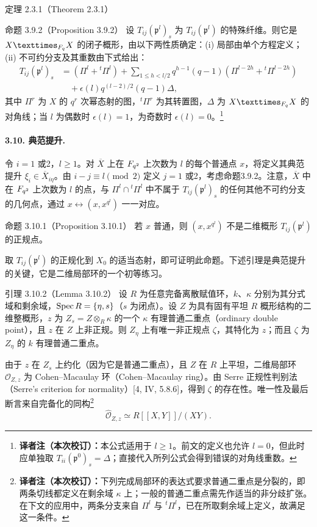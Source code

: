 \begin{originaltheorem}{定理 2.3.1（Theorem 2.3.1）}
\begin{originaltheorem}{命题 3.9.2（Proposition 3.9.2）}
设 $T_{ij}(\mathfrak p^l)_s$ 为 $T_{ij}(\mathfrak p^l)$ 的特殊纤维。则它是 $X\times_{\F_q}X$ 的闭子概形，由以下两性质确定：(i) 局部由单个方程定义；(ii) 不可约分支及其重数由下式给出：
\begin{align*}
 T_{ij}(\mathfrak p^l)_s
 &=(\Pi^l+{}^t\Pi^l)
 +\sum_{1\leq h<l/2}q^{h-1}(q-1)(\Pi^{l-2h}+{}^t\Pi^{l-2h})\\
 &\quad+\epsilon(l)q^{(l-2)/2}(q-1)\Delta,
\end{align*}
其中 $\Pi^r$ 为 $X$ 的 $q^r$ 次幂态射的图，${}^t\Pi^r$ 为其转置图，$\Delta$ 为 $X\times_{\F_q}X$ 的对角线；当 $l$ 为偶数时 $\epsilon(l)=1$，为奇数时 $\epsilon(l)=0$。\footnote{\textbf{译者注（本次校订）：}本公式适用于 $l\ge1$。前文的定义也允许 $l=0$，但此时应单独取 $T_{ii}(\mathfrak p^0)_s=\Delta$；直接代入所列公式会得到错误的对角线重数。}
\end{originaltheorem}

\paragraph*{3.10. 典范提升.}
令 $i=1$ 或2，$l\geq1$。对 $\overline X$ 上在 $F_{q^2}$ 上次数为 $l$ 的每个普通点 $x$，将定义其典范提升 $\xi_i\in\overline X_{i\eta}$。由 $i-j\equiv l\pmod2$ 定义 $j=1$ 或2，考虑命题3.9.2。注意，$\overline X$ 中在 $F_{q^2}$ 上次数为 $l$ 的点，与 $\Pi^l\cap{}^t\Pi^l$ 中不属于 $T_{ij}(\mathfrak p^l)_s$ 的任何其他不可约分支的几何点，通过 $x\leftrightarrow(x,x^{q^l})$ 一一对应。

\begin{originaltheorem}{命题 3.10.1（Proposition 3.10.1）}
若 $x$ 普通，则 $(x,x^{q^l})$ 不是二维概形 $T_{ij}(\mathfrak p^l)$ 的正规点。
\end{originaltheorem}
取 $T_{ij}(\mathfrak p^l)$ 的正规化到 $X_0$ 的适当态射，即可证明此命题。下述引理是典范提升的关键，它是二维局部环的一个初等练习。

\begin{originaltheorem}{引理 3.10.2（Lemma 3.10.2）}
设 $R$ 为任意完备离散赋值环，$k$、$\kappa$ 分别为其分式域和剩余域，$\operatorname{Spec} R=\{\eta,s\}$（$s$ 为闭点）。设 $Z$ 为具有固有平坦 $R$ 概形结构的二维整概形，$z$ 为 $Z_s=Z\otimes_R\kappa$ 的一个 $\kappa$ 有理普通二重点（ordinary double point），且 $z$ 在 $Z$ 上非正规。则 $Z_\eta$ 上有唯一非正规点 $\zeta$，其特化为 $z$；而且 $\zeta$ 为 $Z_\eta$ 的 $k$ 有理普通二重点。
\end{originaltheorem}
由于 $z$ 在 $Z_s$ 上约化（因为它是普通二重点），且 $Z$ 在 $R$ 上平坦，二维局部环 $\mathcal O_{Z,z}$ 为 Cohen--Macaulay 环（Cohen--Macaulay ring）。由 Serre 正规性判别法（Serre's criterion for normality）[4, IV, 5.8.6]，得到 $\zeta$ 的存在性。唯一性及最后断言来自完备化的同构\footnote{\textbf{译者注（本次校订）：}下列完成局部环的表达式要求普通二重点是分裂的，即两条切线都定义在剩余域 $\kappa$ 上；一般的普通二重点需先作适当的非分歧扩张。在下文的应用中，两条分支来自 $\Pi^l$ 与 ${}^t\Pi^l$，已在所取剩余域上定义，故满足这一条件。}
\[
 \widehat{\mathcal O}_{Z,z}\simeq R[[X,Y]]/(XY).
\]


\end{originaltheorem}
